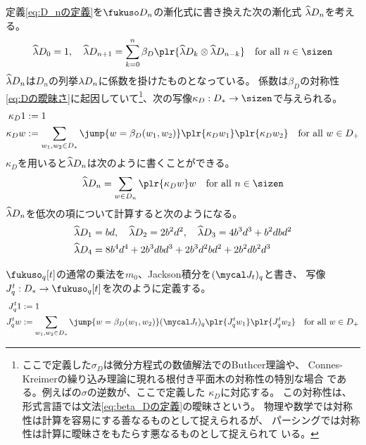 {	定義\eqref{eq:D_nの定義}を$\fukuso D_n$の漸化式に書き換えた次の漸化式
	$\widehat{\lambda} D_n$を考える。
	\begin{equation}\label{eq:列挙係数の漸化式}\begin{split}
		\dupls D_0 = 1,\quad \dupls D_{n+1} = \sum_{k=0}^n 
		\beta_D\plr{\dupls D_k\otimes\dupls D_{n-k}}
		\quad\text{for all } n\in\sizen
	\end{split}\end{equation}
	$\widehat{\lambda} D_n$は$D_n$の列挙${\lambda} D_n$に係数を掛けたものとなっている。
	係数は$\beta_D$の対称性\eqref{eq:Dの曖昧さ}に起因していて\footnote{
		ここで定義した$\sigma_D$は微分方程式の数値解法でのButhcer理論や、
		Connes-Kreimerの繰り込み理論に現れる根付き平面木の対称性の特別な場合
		である。例えば\cite{Gubinelli:2008}の$\sigma$の逆数が、ここで定義した
		$\kappa_D$に対応する。
		この対称性は、形式言語では文法\eqref{eq:beta_Dの定義}の曖昧さという。
		物理や数学では対称性は計算を容易にする善なるものとして捉えられるが、
		パーシングでは対称性は計算に曖昧さをもたらす悪なるものとして捉えられて
		いる。
	}、次の写像$\kappa_D:D_*\to\sizen$で与えられる。
	\begin{equation*}\begin{split}
		\kappa_D 1 &:= 1 \\
		\kappa_D w &:= \sum_{w_1,w_2\in D_*} \jump{w = \beta_D(w_1, w_2)}
			\plr{\kappa_D w_1}\plr{\kappa_D w_2}
			\quad\text{for all } w\in D_+
	\end{split}\end{equation*}
	$\kappa_D$を用いると$\widehat{\lambda} D_n$は次のように書くことができる。
	\begin{equation*}\begin{split}
		\dupls D_n = \sum_{w\in D_n}\plr{\kappa_D w} w 
		\quad\text{for all } n\in\sizen
	\end{split}\end{equation*}
	$\widehat{\lambda} D_n$を低次の項について計算すると次のようになる。
	\begin{equation}\label{低次の列挙係数}\begin{split}
		\widehat{\lambda} D_1 &= bd,\quad \widehat{\lambda} D_2 = 2 b^2d^2
		,\quad \widehat{\lambda} D_3 = 4 b^3d^3 + b^2dbd^2 \\
		\widehat{\lambda} D_4 &= 8 b^4d^4 + 2 b^3dbd^3 + 2 b^3d^2bd^2 + 2 b^2db^2d^3 \\
	\end{split}\end{equation}

	$\fukuso_q[t]$の通常の乗法を$m_0$、Jackson積分を$(\J_t)_q$と書き、
	写像$J_q^t:D_*\to\fukuso_q[t]$を次のように定義する。
	\begin{equation*}\begin{split}
		J_q^t 1 &:= 1 \\
		J_q^t w &:= \sum_{w_1,w_2\in D_*} \jump{w = \beta_D(w_1, w_2)}
			(\J_t)_q\plr{J_q^t w_1}\plr{J_q^t w_2}
			\quad\text{for all } w\in D_+
	\end{split}\end{equation*}

}
